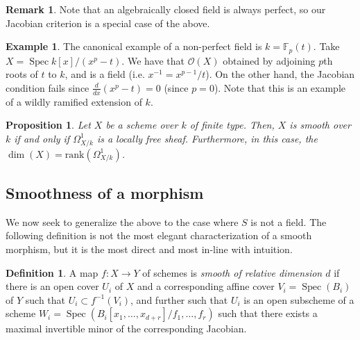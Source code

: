 \documentclass[10pt]{article}
\newtheorem{prop}[thm]{Proposition}
\theoremstyle{definition}
\newtheorem{exmp}[thm]{Example}
\newtheorem{defn}[thm]{Definition}
\newtheorem{rmk}[thm]{Remark}
\DeclareMathOperator{\Spec}{Spec}
\newcommand{\OO}{\mathcal{O}}
\begin{document}
\begin{rmk}
Note that an algebraically closed field is always perfect, so our Jacobian criterion is a special case of the above.
\end{rmk}

\begin{exmp}
The canonical example of a non-perfect field is $k = \mathbb{F}_p(t)$.  Take $X = \Spec k[x]/(x^p - t)$.  We have that $\OO(X)$ obtained by adjoining $p$th roots of $t$ to $k$, and is a field (i.e. $x^{-1} = x^{p-1}/t$).  On the other hand, the Jacobian condition fails since $\frac{d}{dx}(x^p - t) = 0$ (since $p = 0$).  Note that this is an example of a wildly ramified extension of $k$.
\end{exmp}


\begin{prop}
Let $X$ be a scheme over $k$ of finite type.  Then, $X$ is smooth over $k$ if and only if $\Omega^1_{X/k}$ is a locally free sheaf.  Furthermore, in this case, the $\dim(X) = \mathrm{rank}(\Omega^1_{X/k})$.
\end{prop}
%
%
%



\subsection{Smoothness of a morphism}


We now seek to generalize the above to the case where $S$ is not a field.  The following definition is not the most elegant characterization of a smooth morphism, but it is the most direct and most in-line with intuition.
\begin{defn}
A map $f: X \rightarrow Y$ of schemes is \emph{smooth of relative dimension $d$} if there is an open cover $U_i$ of $X$ and a corresponding affine cover $V_i = \Spec(B_i)$ of $Y$ such that $U_i \subset f^{-1}(V_i)$, and further such that $U_i$ is an open subscheme of a scheme $W_i = \Spec(B_i[x_1, \ldots, x_{d+r}]/f_1, \ldots, f_r)$ such that there exists a maximal invertible minor of the corresponding Jacobian.
\end{defn}
\end{document}
